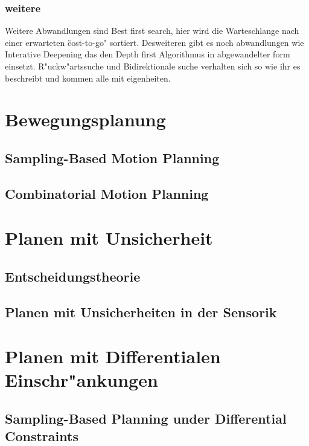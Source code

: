 \subsubsection{weitere}
Weitere Abwandlungen sind Best first search, hier wird die Warteschlange nach einer erwarteten \"cost-to-go" sortiert. 
Desweiteren gibt es noch abwandlungen wie Interative Deepening das den Depth first Algorithmus in abgewandelter form einsetzt. 
R"uckw"artssuche und Bidirektionale suche verhalten sich so wie ihr es beschreibt und kommen alle mit eigenheiten. 

 
\section{Bewegungsplanung}
\subsection{Sampling-Based Motion Planning}
\subsection{Combinatorial Motion Planning}
\section{Planen mit Unsicherheit}
\subsection{Entscheidungstheorie}
\subsection{Planen mit Unsicherheiten in der Sensorik}
\section{Planen mit Differentialen Einschr"ankungen}
\subsection{Sampling-Based Planning under Differential Constraints}
